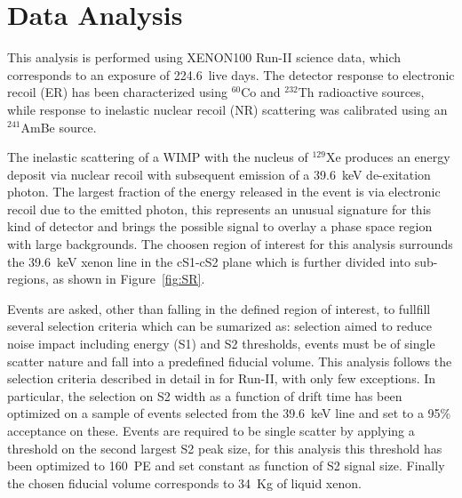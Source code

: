 \section{Data Analysis}

This analysis is performed using XENON100 Run-II science data, which corresponds to an exposure of 224.6~live days. The detector response to
electronic recoil (ER) has been characterized using $^{60}$Co and $^{232}$Th radioactive sources, while response to inelastic nuclear recoil (NR)
scattering was calibrated using an $^{241}$AmBe source. 

The inelastic scattering of a WIMP with the nucleus of $^{129}$Xe produces an energy deposit via nuclear recoil with subsequent emission of  
a 39.6~keV de-exitation photon. 
The largest fraction of the energy released in the event is via electronic recoil due to the emitted photon, this represents an
unusual signature for this kind of detector and brings the possible signal to overlay a phase space region with large backgrounds.
The choosen region of interest for this analysis surrounds the 39.6~keV xenon line in the cS1-cS2 plane which is further divided into
sub-regions, as shown in Figure~\ref{fig:SR}.

Events are asked, other than falling in the defined region of interest, to fullfill several selection criteria which can be sumarized as:
selection aimed to reduce noise impact including energy (S1) and S2 thresholds, events must be of single scatter nature and fall 
into a predefined fiducial volume. This analysis follows the selection criteria described in detail in \cite{dataAnalysis} for Run-II, 
with only few exceptions. 
In particular, the selection on S2 width as a function of drift time has been optimized on a sample of events selected from the 39.6~keV line
and set to a 95\% acceptance on these. Events are required to be single scatter by applying a threshold on the 
second largest S2 peak size,  for this analysis this threshold has been optimized to 160~PE and set constant as function of S2 signal size. 
Finally the chosen fiducial volume corresponds to 34~Kg of liquid xenon.


